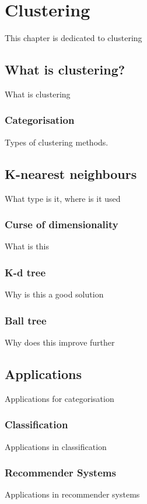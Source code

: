 \chapter{Clustering}
\label {chap:cluster}

This chapter is dedicated to clustering

\section{What is clustering?}
\label{sec:cluster_what}

What is clustering

\subsection{Categorisation}
\label{subsec:cluster_what_category}

Types of clustering methods.

\section{K-nearest neighbours}
\label{sec:cluster_knn}

What type is it, where is it used

\subsection{Curse of dimensionality}
\label{subsec:cluster_knn_curse}

What is this

\subsection{K-d tree}
\label{subsec:cluster_knn_kdtree}

Why is this a good solution

\subsection{Ball tree}
\label{subsec:cluster_knn_balltree}

Why does this improve further

\section{Applications}
\label{sec:cluster_applications}

Applications for categorisation

\subsection{Classification}
\label{subsec:cluster_applications_classification}

Applications in classification

\subsection{Recommender Systems}
\label{subsec:cluster_applications_recommenders}

Applications in recommender systems
